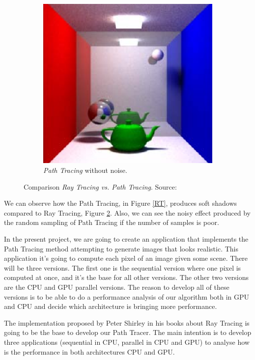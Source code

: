 \documentclass[titlepage,12pt]{report}
\begin{document}
\begin{figure}[H]
\begin{subfigure}{.3\textwidth}
		\includegraphics[width=.8\textwidth]{media/PathTracingMD.png}	
		\caption{\textit{Path Tracing} without noise.}
		\label{PT}
	\end{subfigure}
	\caption{Comparison \textit{Ray Tracing vs. Path Tracing}. Source: \citep[pp.~23--29]{Cassagnabere2004}}
\end{figure}

We can observe how the Path Tracing, in Figure \ref{RT}, produces soft shadows compared to Ray Tracing, Figure \ref{PT}. Also, we can see the noisy effect produced by the random sampling of Path Tracing if the number of samples is poor.

In the present project, we are going to create an application that implements the Path Tracing method attempting to generate images that looks realistic. This application it's going to compute each pixel of an image given some scene. There will be three versions. The first one is the sequential version where one pixel is computed at once, and it's the base for all other versions. The other two versions are the CPU and GPU parallel versions. The reason to develop all of these versions is to be able to do a performance analysis of our algorithm both in GPU and CPU and decide which architecture is bringing more performance.

The implementation proposed by Peter Shirley in his books about Ray Tracing  \citep{ShirleyRTA, ShirleyRTB, ShirleyRTC} is going to be the base to develop our Path Tracer. The main intention is to develop three applications (sequential in CPU, parallel in CPU and GPU) to analyse how is the performance in both architectures CPU and GPU.
\end{document}

